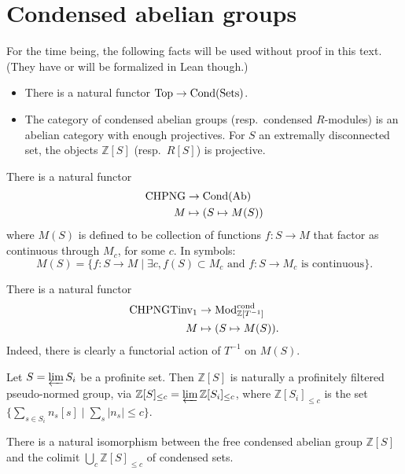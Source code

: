 \section{Condensed abelian groups}

\begin{remark}
  For the time being, the following facts will be used without proof in this text.
  (They have or will be formalized in Lean though.)

  \begin{itemize}
    \item There is a natural functor $\operatorname{Top} \to \operatorname{Cond}(\operatorname{Sets})$.
    \item The category of condensed abelian groups (resp.~condensed $R$-modules)
      is an abelian category with enough projectives.
      For $S$ an extremally disconnected set, the objects $\mathbb Z[S]$ (resp.~$R[S]$) is projective.
  \end{itemize}
\end{remark}

\begin{definition}
  \label{CHPNG-to-Cond}
  There is a natural functor
  \begin{align*}
    \text{CHPNG} &\to \operatorname{Cond}(\operatorname{Ab}) \\
    M &\mapsto (S \mapsto M(S))
  \end{align*}
  where $M(S)$ is defined to be collection of functions $f \colon S \to M$ that factor as continuous through $M_c$, for some $c$.
  In symbols:
  \[ M(S) = \{f \colon S \to M \mid \exists c, f(S) \subset M_c \text{ and $f \colon S \to M_c$ is continuous}\}. \]
\end{definition}

\begin{definition}
  \label{CHPNGTinv-to-Cond}
  There is a natural functor
  \begin{align*}
    \text{CHPNGTinv}_1 &\to \mathrm{Mod}^{\mathrm{cond}}_{\mathbb Z[T^{-1}]} \\
    M &\mapsto (S \mapsto M(S)).
  \end{align*}
  Indeed, there is clearly a functorial action of $T^{-1}$ on $M(S)$.
\end{definition}

\begin{lemma}
  \label{free-png}
  Let $S = \varprojlim S_i$ be a profinite set.
  Then $\mathbb Z[S]$ is naturally a profinitely filtered pseudo-normed group,
  via $\mathbb Z[S]_{\le c} = \varprojlim \mathbb Z[S_i]_{\le c}$,
  where $\mathbb Z[S_i]_{\le c}$ is the set $\{\sum_{s \in S_i} n_s[s] \mid \sum_s |n_s| \le c\}$.

  There is a natural isomorphism between the free condensed abelian group $\mathbb Z[S]$
  and the colimit $\bigcup_c \mathbb Z[S]_{\le c}$ of condensed sets.
\end{lemma}

